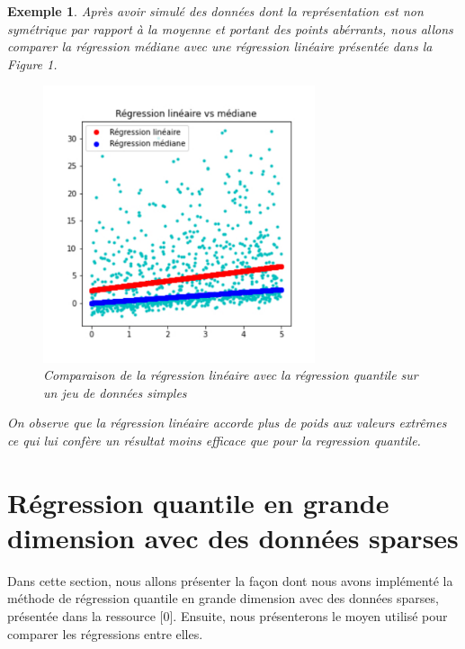 \documentclass{article}
\newtheorem{example}{Exemple}
\begin{document}
\begin{example}
Après avoir simulé des données dont la représentation est non symétrique par rapport à la moyenne et portant des points abérrants, nous allons comparer la régression médiane avec une régression linéaire présentée dans la Figure 1. 
 \begin{figure}[!h]
    \begin{center}
   \caption{\label{étiquette} Comparaison de la régression linéaire avec la régression quantile sur un jeu de données simples}
   \includegraphics[width=8cm]{reg1.pdf}
   \end{center}
    \end{figure}
On observe que la régression linéaire accorde plus de poids aux valeurs extrêmes ce qui lui confère un résultat moins efficace que pour la regression quantile. 
\end{example}
\vspace{0.5cm}

\section{Régression quantile en grande dimension avec des données sparses}
Dans cette section, nous allons présenter la façon dont nous avons implémenté la méthode de régression quantile en grande dimension avec des données sparses, présentée dans la ressource [0]. Ensuite, nous présenterons le moyen utilisé pour comparer les régressions entre elles. 
\vspace{0.2cm}
\end{document}
